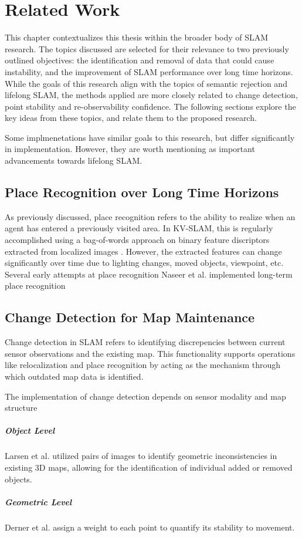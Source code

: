 \section{Related Work}
\label{sec:related_work}

This chapter contextualizes this thesis within the broader body of SLAM research. The topics discussed are selected for their relevance to two previously outlined objectives: the identification and removal of data that could cause instability, and the improvement of SLAM performance over long time horizons. While the goals of this research align with the topics of semantic rejection and lifelong SLAM, the methods applied are more closely related to change detection, point stability and re-observability confidence. The following sections explore the key ideas from these topics, and relate them to the proposed research.

Some implmenetations have similar goals to this research, but differ significantly in implementation. However, they are worth mentioning as important advancements towards lifelong SLAM.

\subsection{Place Recognition over Long Time Horizons}

As previously discussed, place recognition refers to the ability to realize when an agent has entered a previously visited area. In KV-SLAM, this is regularly accomplished using a bag-of-words approach on binary feature discriptors extracted from localized images \cite{camposORBSLAM3AccurateOpenSource2021}. However, the extracted features can change significantly over time due to lighting changes, moved objects, viewpoint, etc. Several early attempts at place recognition Naseer et al. \cite{naseerVisionbasedMarkovLocalization2015} implemented long-term place recognition

\subsection{Change Detection for Map Maintenance}

Change detection in SLAM refers to identifying discrepencies between current sensor observations and the existing map. This functionality supports operations like relocalization and place recognition by acting as the mechanism through which outdated map data is identified.

The implementation of change detection depends on sensor modality and map structure




\subparagraph{Object Level}
Larsen et al. \cite{larsenChangeDetectionModel} utilized pairs of images to identify geometric inconsistencies in existing 3D maps, allowing for the identification of individual added or removed objects.

\subparagraph{Geometric Level}
Derner et al. \cite{dernerChangeDetectionUsing2021} assign a weight to each point to quantify its stability to movement.




